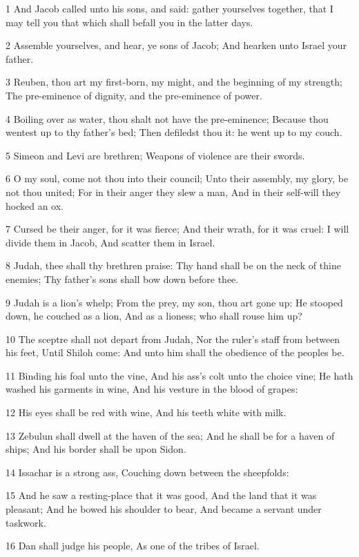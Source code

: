 \par 1 And Jacob called unto his sons, and said: gather yourselves together, that I may tell you that which shall befall you in the latter days.
\par 2 Assemble yourselves, and hear, ye sons of Jacob; And hearken unto Israel your father.
\par 3 Reuben, thou art my first-born, my might, and the beginning of my strength; The pre-eminence of dignity, and the pre-eminence of power.
\par 4 Boiling over as water, thou shalt not have the pre-eminence; Because thou wentest up to thy father's bed; Then defiledst thou it: he went up to my couch.
\par 5 Simeon and Levi are brethren; Weapons of violence are their swords.
\par 6 O my soul, come not thou into their council; Unto their assembly, my glory, be not thou united; For in their anger they slew a man, And in their self-will they hocked an ox.
\par 7 Cursed be their anger, for it was fierce; And their wrath, for it was cruel: I will divide them in Jacob, And scatter them in Israel.
\par 8 Judah, thee shall thy brethren praise: Thy hand shall be on the neck of thine enemies; Thy father's sons shall bow down before thee.
\par 9 Judah is a lion's whelp; From the prey, my son, thou art gone up: He stooped down, he couched as a lion, And as a lioness; who shall rouse him up?
\par 10 The sceptre shall not depart from Judah, Nor the ruler's staff from between his feet, Until Shiloh come: And unto him shall the obedience of the peoples be.
\par 11 Binding his foal unto the vine, And his ass's colt unto the choice vine; He hath washed his garments in wine, And his vesture in the blood of grapes:
\par 12 His eyes shall be red with wine, And his teeth white with milk.
\par 13 Zebulun shall dwell at the haven of the sea; And he shall be for a haven of ships; And his border shall be upon Sidon.
\par 14 Issachar is a strong ass, Couching down between the sheepfolds:
\par 15 And he saw a resting-place that it was good, And the land that it was pleasant; And he bowed his shoulder to bear, And became a servant under taskwork.
\par 16 Dan shall judge his people, As one of the tribes of Israel.
